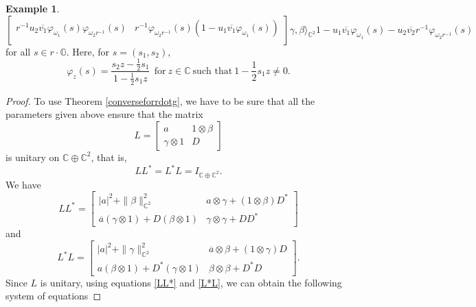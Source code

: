\documentclass[12pt,reqno]{amsart}
\numberwithin{equation}{section}
\renewcommand\phi{\varphi}
\theoremstyle{definition}
\newtheorem{example}[equation]{Example}
\begin{document}
\begin{example}
{{{\begin{equation}
{\begin{bmatrix}
    r^{-1}u_{2}\overline{v_{1}}\phi_{\omega_{1}}(s)\phi_{\omega_{2}r^{-1}}(s) & r^{-1}\phi_{\omega_{2}r^{-1}}(s)
    (1-u_{1}\overline{v_{1}} \phi_{\omega_{1}}(s))\\
\end{bmatrix}\gamma,\beta\Bigg\rangle_{\mathbb{C}^{2}}}{1-u_{1}\overline{v_{1}}\phi_{\omega_{1}}(s)-u_{2}\overline{v_{2}}
r^{-1}\phi_{\omega_{2}r^{-1}}(s)}
\end{equation}  }
for all $s\in r\cdot\mathbb{G}$. Here, for $s=(s_1,s_2)$,
\begin{equation}\label{defszforgr}
\phi_{z}(s) = \dfrac{s_{2}z-\frac{1}{2}s_{1}}{1-\frac{1}{2}s_{1}z}~~\text{for}~z\in\mathbb{C}~\text{such that}~1-\frac{1}{2}s_{1}z\neq0.
\end{equation}
}}
\end{example}
\begin{proof} To use Theorem \ref{converseforrdotg}, we have to be sure that all the parameters given above ensure that the matrix
\begin{equation}
L=\begin{bmatrix}
    a       & 1\otimes \beta \\
    \gamma \otimes 1       & D 
\end{bmatrix}
\end{equation}
is unitary on $\mathbb{C}\oplus \mathbb{C}^{2}$, that is, 
\begin{equation}\label{L-unitary}
LL^{*}=L^{*}L=I_{\mathbb{C}\oplus\mathbb{C}^{2}}.
\end{equation}
We have
\begin{equation}\label{LL*}
LL^{*} = \begin{bmatrix}
    |a|^{2}+\|\beta\|^{2}_{\mathbb{C}^{2}} & a\otimes\gamma+(1\otimes\beta)D^{*}\\
    \overline{a}(\gamma\otimes1)+D(\beta\otimes 1) & \gamma\otimes\gamma +DD^{*}
\end{bmatrix}
\end{equation}
and 
\begin{equation}\label{L*L}
L^{*}L = \begin{bmatrix}
    |a|^{2}+\|\gamma\|^{2}_{\mathbb{C}^{2}} & \overline{a}\otimes\beta+(1\otimes\gamma)D\\
    a(\beta\otimes1)+D^{*}(\gamma\otimes 1) & \beta\otimes\beta +D^{*}D
\end{bmatrix}.
\end{equation}
Since $L$ is unitary, using equations \eqref{LL*} and \eqref{L*L}, we can obtain  the following system of equations 

\end{proof}
\end{document}

